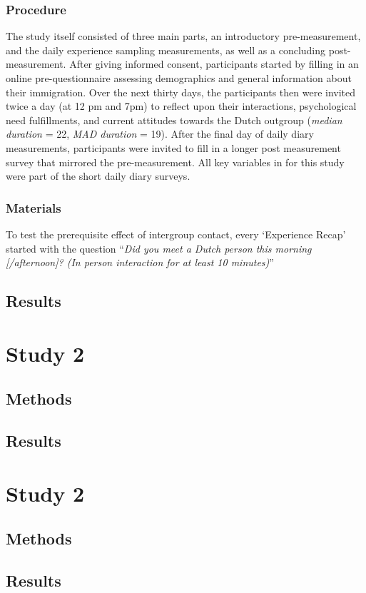\subsubsection{Procedure}

The study itself consisted of three main parts, an introductory
pre-measurement, and the daily experience sampling measurements, as well
as a concluding post-measurement. After giving informed consent,
participants started by filling in an online pre-questionnaire assessing
demographics and general information about their immigration. Over the
next thirty days, the participants then were invited twice a day (at 12
pm and 7pm) to reflect upon their interactions, psychological need
fulfillments, and current attitudes towards the Dutch outgroup
(\textit{median duration} = 22, \textit{MAD duration} = 19). After the
final day of daily diary measurements, participants were invited to fill
in a longer post measurement survey that mirrored the pre-measurement.
All key variables in for this study were part of the short daily diary
surveys.

\subsubsection{Materials}


To test the prerequisite effect of intergroup contact, every `Experience
Recap' started with the question
``\textit{Did you meet a Dutch person this morning [/afternoon]? (In person interaction for at least 10 minutes)}''

\subsection{Results}

\section{Study 2}

\subsection{Methods}

\subsection{Results}

\section{Study 2}

\subsection{Methods}

\subsection{Results}
